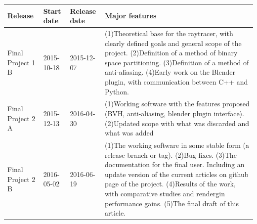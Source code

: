 \documentclass[a4paper]{sbgames}               %
\begin{document}
\begin{tabular}{ | p{.8cm} | p{1cm} | p{1cm} | p{4cm} |}
  \hline
  Release & Start date & Release date & Major features \\ \hline
  Final Project 1 B & 2015-10-18 & 2015-12-07 & (1)Theoretical base for the raytracer, with clearly defined goals and
                                                general scope of the project. (2)Definition of a method of binary
                                                space partitioning. (3)Definition of a method of anti-aliasing.
                                                (4)Early work on the Blender plugin, with communication between C++ and Python. \\ \hline
  Final Project 2 A & 2015-12-13 & 2016-04-30 & (1)Working software with the features proposed (BVH, anti-aliasing, blender plugin interface).
                                                (2)Updated scope with what was discarded and what was added \\ \hline
  Final Project 2 B & 2016-05-02 & 2016-06-19 & (1)The working software in some stable form (a release branch or tag). (2)Bug fixes.
                                                (3)The documentation for the final user. Including an update version of
                                                the current articles on github page of the project. (4)Results of the work,
                                                with comparative studies and rendergin performance gains.
                                                (5)The final draft of this article. \\ \hline
\end{tabular}





\end{document}
